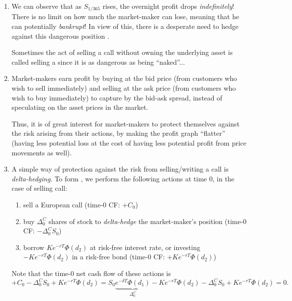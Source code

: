 \begin{enumerate}
\begin{center}
\end{center}

\item We can observe that as \(S_{1/365}\) rises, the overnight profit drops
\emph{indefinitely}! There is no limit on how much the market-maker can lose,
meaning that he can potentially \emph{bankrupt}! In view of this, there is a
desperate need to hedge against this dangerous position \warn{}.

\begin{note}
Sometimes the act of selling a call without owning the underlying asset is
called selling a  since it is as dangerous as being
``naked''...
\end{note}

\item Market-makers earn profit by buying at the bid price (from customers who
wish to sell immediately) and selling at the ask price (from customers who wish
to buy immediately) to capture by the bid-ask spread, instead of speculating on
the asset prices in the market.

Thus, it is of great interest for market-makers to protect themselves against
the risk arising from their actions, by making the profit graph ``flatter''
(having less potential loss at the cost of having less potential profit from
price movements as well).

\item \label{it:delta-hedging-actions}
A simple way of protection against the risk from selling/writing a call
is \emph{delta-hedging}. To form , we perform the following
actions at time 0, in the case of selling call:

\begin{enumerate}[label={(\arabic*)}]
\item sell a European call (time-0 CF: \(+C_0\))
\item buy \(\Delta_0^C\) shares of stock to \emph{delta-hedge} the
market-maker's position (time-0 CF: \(-\Delta_0^CS_0\))
\item borrow \(Ke^{-rT}\Phi(d_2)\) at risk-free interest rate, or investing
\(-Ke^{-rT}\Phi(d_2)\) in a risk-free bond (time-0 CF: \(+Ke^{-rT}\Phi(d_2)\))
\end{enumerate}
Note that the time-0 net cash flow of these actions is
\[
+C_0-\Delta_0^{C}S_0+Ke^{-rT}\Phi(d_2)
=S_0\underbrace{e^{-\delta T}\Phi(d_1)}_{\Delta_0^C}-Ke^{-rT}\Phi(d_2)-\Delta_0^{C}S_0+Ke^{-rT}\Phi(d_2)
=0.
\]


\end{enumerate}
